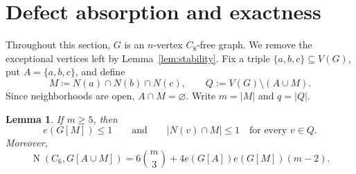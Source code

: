 \documentclass[11pt,letterpaper]{article}
\newtheorem{lemma}[theorem]{Lemma}
\newcommand{\N}{\operatorname{N}}
\begin{document}
\section{Defect absorption and exactness}

Throughout this section, \(G\) is an \(n\)-vertex \(C_8\)-free graph. We remove the exceptional
vertices left by Lemma~\ref{lem:stability}. Fix a triple \(\{a,b,c\}\subseteq V(G)\), put
\(A=\{a,b,c\}\), and define
\[
  M\coloneqq N(a)\cap N(b)\cap N(c),\qquad
  Q:=V(G)\setminus(A\cup M).
\]
Since neighborhoods are open, \(A\cap M=\varnothing\). Write \(m=|M|\) and \(q=|Q|\). %

\begin{lemma}\label{lem:terminal}
If \(m\ge5\), then
\[
  e(G[M])\le1
  \qquad\text{and}\qquad
  |N(v)\cap M|\le1\quad\text{for every }v\in Q.
\]
Moreover,
\[
  \N(C_6,G[A\cup M])=6\binom m3+4e(G[A])e(G[M])(m-2).
\]
\end{lemma}
\end{document}
